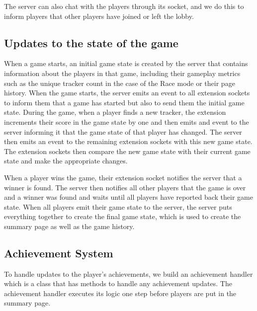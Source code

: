 \documentclass{l4proj}
\begin{document}
The server can also chat with the players through its socket, and we do this to inform players that other players have joined or left the lobby.

\subsection{Updates to the state of the game}
When a game starts, an initial game state is created by the server that contains information about the players in that game, including their gameplay metrics such as the unique tracker count in the case of the Race mode or their page history. When the game starts, the server emits an event to all extension sockets to inform them that a game has started but also to send them the initial game state. During the game, when a player finds a new tracker, the extension increments their score in the game state by one and then emits and event to the server informing it that the game state of that player has changed. The server then emits an event to the remaining extension sockets with this new game state. The extension sockets then compare the new game state with their current game state and make the appropriate changes.

When a player wins the game, their extension socket notifies the server that a winner is found. The server then notifies all other players that the game is over and a winner was found and waits until all players have reported back their game state. When all players emit their game state to the server, the server puts everything together to create the final game state, which is used to create the summary page as well as the game history.

\subsection{Achievement System}
To handle updates to the player's achievements, we build an achievement handler which is a class that has methods to handle any achievement updates. The achievement handler executes its logic one step before players are put in the summary page. 
\end{document}
